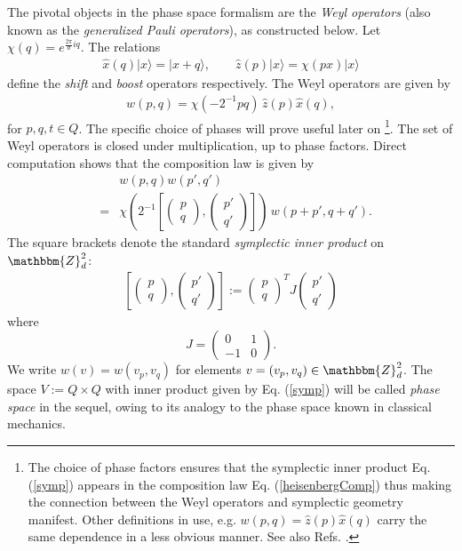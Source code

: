 \documentclass[aps,twocolumn,floatfix]{revtex4}
\def\Symp#1,#2,#3,#4.{\left[\left(\begin{array}{c}#1\\#2\end{array}\right),\left(\begin{array}{c}#3\\#4\end{array}\right)\right]}
\def\Vec#1,#2.{\left(\!\begin{array}{c}#1\\#2\end{array}\!\right)}
\def\ket#1.{|#1\rangle}
\def\ZZ{\mathbbm{Z}}
\begin{document}
The pivotal objects in the phase space formalism are the \emph{Weyl
operators} (also known as the \emph{generalized Pauli operators}), as
constructed below. Let $\chi(q)=e^{\frac{2\pi}d i q}$.  The relations
\begin{eqnarray}\label{shiftClock}
  \hat x(q)\ket x. = \ket x+q., \quad\quad
	\hat z(p)\ket x. = \chi(p x) \ket x.
\end{eqnarray}
define the \emph{shift} and \emph{boost} operators respectively.
The Weyl operators are given by
\begin{eqnarray}\label{weylOps}
	w(p,q)=\chi(-2^{-1}p q)\, \hat z(p)\hat x(q),
\end{eqnarray}
for $p,q,t \in Q$. The specific choice of phases will prove useful
later on \footnote{
	The choice of phase factors ensures that the symplectic inner
	product Eq. (\ref{symp}) appears in the composition law
	Eq. (\ref{heisenbergComp}) thus making the connection between the Weyl
	operators and symplectic geometry manifest. Other definitions
	in use, e.g. $w(p,q)=\hat z(p)\hat x(q)$ carry the same dependence
	in a less obvious manner.
	See also Refs. \cite{vourdas,folland}. 
}.
The set of Weyl operators is closed under multiplication, up to phase
factors.  Direct computation shows
that the composition law is given by
\begin{eqnarray}\label{heisenbergComp}
	&& w(p, q) w(p', q') \\
	&=&
	\chi(2^{-1} \Symp p, q, p', q'.)\,w(p + p', q + q'). \nonumber
\end{eqnarray}
The square brackets denote the standard \emph{symplectic 
inner product} on $\ZZ_d^2$:
\begin{eqnarray}\label{symp}
  \Symp p,q,p',q'.:=\Vec p, q.^T J \Vec p', q'.
\end{eqnarray}
where
\begin{equation} \label{jMatrix}
	J = 
		\left(
			\begin{array}{cc}
				0	&	1 \\
				-1 & 0
			\end{array}
		\right).
\end{equation}
We write $w(v)=w(v_p, v_q)$ for elements $v=(v_p,v_q) \in \ZZ_d^2$.
The space $V:=Q\times Q$ with inner product given by Eq. (\ref{symp})
will be called \emph{phase space} in the sequel, owing to its analogy
to the phase space known in classical mechanics.
\end{document}
